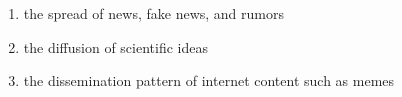 \begin{enumerate}
    \item the spread of news, fake news, and rumors
    \item the diffusion of scientific ideas
    \item the dissemination pattern of internet content such as memes
\end{enumerate}
